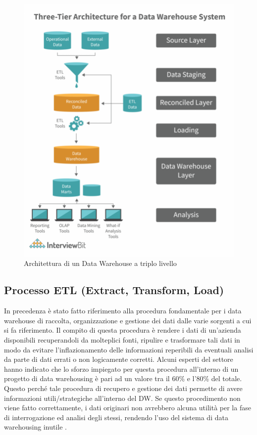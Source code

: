 \begin{itemize}
\begin{figure}[H]
    \includegraphics[height=0.7\linewidth]{figure/capitolo_2/DW - Triple Tier Architetcure.pdf}
    \caption{Architettura di un Data Warehouse a triplo livello} 
    \label{fig:DW - Triple Tier Architetcure}
    \end{figure}
\end{itemize}

\subsection{Processo ETL (Extract, Transform, Load)}

In precedenza è stato fatto riferimento alla procedura fondamentale per i data warehouse di raccolta, organizzazione e gestione dei dati dalle varie sorgenti a cui si fa riferimento. Il compito di questa procedura è rendere i dati di un'azienda disponibili recuperandoli da molteplici fonti, ripulire e trasformare tali dati in modo da evitare l'inflazionamento delle informazioni reperibili da eventuali analisi da parte di dati errati o non logicamente corretti. Alcuni esperti del settore hanno indicato che lo sforzo impiegato per questa procedura all'interno di un progetto di data warehousing è pari ad un valore tra il 60\% e l'80\% del totale. Questo perché tale procedura di recupero e gestione dei dati permette di avere informazioni utili/strategiche all'interno del DW. Se questo procedimento non viene fatto correttamente, i dati originari non avrebbero alcuna utilità per la fase di interrogazione ed analisi degli stessi, rendendo l'uso del sistema di data warehousing inutile \cite{researchgate_etl_process}.

